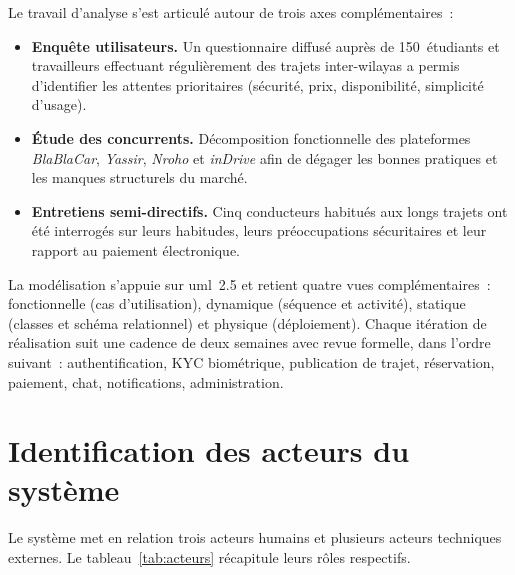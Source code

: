 \documentclass[12pt, a4paper, oneside]{report}
\begin{document}
Le travail d'analyse s'est articulé autour de trois axes complémentaires~:
\begin{itemize}
  \item \textbf{Enquête utilisateurs.} Un questionnaire diffusé auprès de 150~étudiants et travailleurs effectuant régulièrement des trajets inter-wilayas a permis d'identifier les attentes prioritaires (sécurité, prix, disponibilité, simplicité d'usage).
  \item \textbf{Étude des concurrents.} Décomposition fonctionnelle des plateformes \textit{BlaBlaCar}, \textit{Yassir}, \textit{Nroho} et \textit{inDrive} afin de dégager les bonnes pratiques et les manques structurels du marché.
  \item \textbf{Entretiens semi-directifs.} Cinq conducteurs habitués aux longs trajets ont été interrogés sur leurs habitudes, leurs préoccupations sécuritaires et leur rapport au paiement électronique.
\end{itemize}

La modélisation s'appuie sur \gls{uml}~2.5 et retient quatre vues complémentaires~: fonctionnelle (cas d'utilisation), dynamique (séquence et activité), statique (classes et schéma relationnel) et physique (déploiement). Chaque itération de réalisation suit une cadence de deux semaines avec revue formelle, dans l'ordre suivant~: authentification, KYC biométrique, publication de trajet, réservation, paiement, chat, notifications, administration.

\section{Identification des acteurs du système}
\label{sec:acteurs}

Le système met en relation trois acteurs humains et plusieurs acteurs techniques externes. Le tableau~\ref{tab:acteurs} récapitule leurs rôles respectifs.
\end{document}
